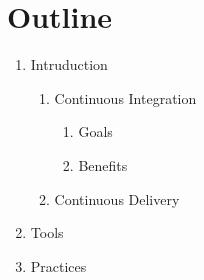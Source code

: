 \section*{Outline}
\begin{enumerate}
    \item Intruduction
    \begin{enumerate}
        \item Continuous Integration
        \begin{enumerate}
            \item Goals
            \item Benefits
        \end{enumerate}
        \item Continuous Delivery
    \end{enumerate}
    \item Tools
    \item Practices
\end{enumerate}